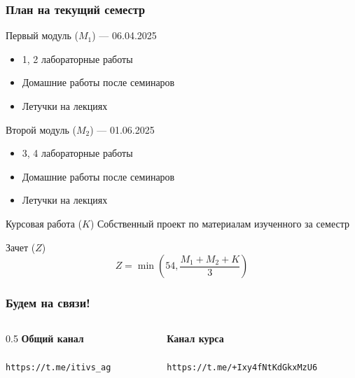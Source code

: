 \documentclass[10pt]{beamer}
\begin{document}
\begin{frame}\frametitle{План на текущий семестр}
	
	{
		\begin{block}{Первый модуль ($M_1$) --- 06.04.2025}
			\begin{itemize}
				\item 1, 2 лабораторные работы
				\item Домашние работы после семинаров
				\item Летучки на лекциях
			\end{itemize}
		\end{block}	
		
	}{
	
		\begin{block}{Второй модуль ($M_2$) --- 01.06.2025}
			\begin{itemize}
				\item 3, 4 лабораторные работы
				\item Домашние работы после семинаров
				\item Летучки на лекциях
			\end{itemize}
		\end{block}	
		
	}
	
	\begin{block}{Курсовая работа ($K$)}
		Собственный проект по материалам изученного за семестр
	\end{block}	
	
	\begin{block}{Зачет ($Z$)}
		$$Z = \min \left(54, \dfrac{M_1+M_2+K}{3} \right) $$ 
	\end{block}	
	
	
\end{frame}
	


\begin{frame}[fragile]\frametitle{Будем на связи!}
	
	
	
	\begin{columns}[onlytextwidth]
		\edef\colA{0.5}
		\begin{column}{\colA\linewidth}
					\centering \textbf{Общий канал}\\
					\\
					{\small\verb|https://t.me/itivs_ag|} \\
		\end{column}
		\begin{column}{\fpeval{1-\colA}\linewidth}
					\centering \textbf{Канал курса}\\
					\\
					{\small\verb|https://t.me/+Ixy4fNtKdGkxMzU6|} \\
		\end{column}
	\end{columns}

	
\end{frame}
	
	

	
\end{document}
